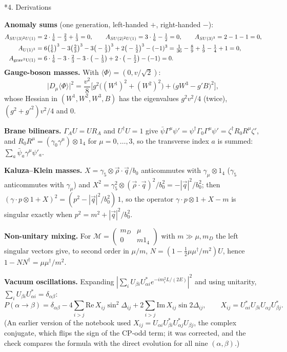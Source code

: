\documentclass[10pt,a4paper]{article}
\makeatletter
\renewcommand\section{\@startsection{section}{1}{\z@}{-3.5ex \@plus -1ex \@minus -.2ex}{2.3ex \@plus.2ex}{\normalfont\Large\bfseries\raggedright}}
\makeatother
\begin{document}
\section*{4. Derivations}
\textbf{Anomaly sums} (one generation, left-handed $+$, right-handed $-$):
\begin{align*}
A_{SU(3)^2U(1)}&=2\cdot\tfrac16-\tfrac23+\tfrac13=0,\qquad A_{SU(2)^2U(1)}=3\cdot\tfrac16-\tfrac12=0,\qquad A_{SU(3)^3}=2-1-1=0, \\
A_{U(1)^3}&=6\big(\tfrac16\big)^3-3\big(\tfrac23\big)^3-3\big(-\tfrac13\big)^3+2\big(-\tfrac12\big)^3-(-1)^3=\tfrac1{36}-\tfrac89+\tfrac19-\tfrac14+1=0, \\
A_{\rm grav^2U(1)}&=6\cdot\tfrac16-3\cdot\tfrac23-3\cdot\big(-\tfrac13\big)+2\cdot\big(-\tfrac12\big)-(-1)=0 .
\end{align*}
\textbf{Gauge-boson masses.} With $\langle\Phi\rangle=(0,v/\sqrt2)$:
\begin{equation*}
\big|D_\mu\langle\Phi\rangle\big|^2=\frac{v^2}8\Big[g^2\big((W^1)^2+(W^2)^2\big)+\big(gW^3-g'B\big)^2\Big],
\end{equation*}
whose Hessian in $(W^1,W^2,W^3,B)$ has the eigenvalues $g^2v^2/4$ (twice), $(g^2+g'^2)v^2/4$ and $0$.

\textbf{Brane bilinears.} $\Gamma_AU=UR_A$ and $U^\dagger U=1$ give $\bar\psi\Gamma^\mu\psi'=\psi^\dagger\Gamma_0\Gamma^\mu\psi'=\zeta^\dagger R_0R^\mu\zeta'$, and $R_0R^\mu=(\gamma_0\gamma^\mu)\otimes1_4$ for $\mu=0,\dots,3$, so the transverse index $a$ is summed: $\sum_a\bar\psi_a\gamma^\mu\psi'_a$.

\textbf{Kaluza–Klein masses.} $X=\gamma_5\otimes\vec\rho\cdot\vec q/b_0$ anticommutes with $\gamma_\mu\otimes1_4$ ($\gamma_5$ anticommutes with $\gamma_\mu$) and $X^2=\gamma_5^2\otimes(\vec\rho\cdot\vec q)^2/b_0^2=-|\vec q|^2/b_0^2$; then $(\gamma\cdot p\otimes1+X)^2=(p^2-|\vec q|^2/b_0^2)\,1$, so the operator $\gamma\cdot p\otimes1+X-m$ is singular exactly when $p^2=m^2+|\vec q|^2/b_0^2$.

\textbf{Non-unitary mixing.} For $\mathcal M=\begin{pmatrix}m_D&\mu\\0&m1_4\end{pmatrix}$ with $m\gg\mu,m_D$ the left singular vectors give, to second order in $\mu/m$, $N=(1-\tfrac12\mu\mu^\dagger/m^2)U$, hence $1-NN^\dagger=\mu\mu^\dagger/m^2$.

\textbf{Vacuum oscillations.} Expanding $|\sum_iU_{\beta i}U^*_{\alpha i}e^{-im_i^2L/(2E)}|^2$ and using unitarity, $\sum_iU_{\beta i}U^*_{\alpha i}=\delta_{\alpha\beta}$:
\begin{equation*}
P(\alpha\to\beta)=\delta_{\alpha\beta}-4\sum_{i>j}\mathrm{Re}\,X_{ij}\sin^2\Delta_{ij}+2\sum_{i>j}\mathrm{Im}\,X_{ij}\sin2\Delta_{ij},\qquad X_{ij}=U^*_{\alpha i}U_{\beta i}U_{\alpha j}U^*_{\beta j}.
\end{equation*}
(An earlier version of the notebook used $X_{ij}=U_{\alpha i}U^*_{\beta i}U^*_{\alpha j}U_{\beta j}$, the complex conjugate, which flips the sign of the CP-odd term; it was corrected, and the check compares the formula with the direct evolution for all nine $(\alpha,\beta)$.)
\end{document}
